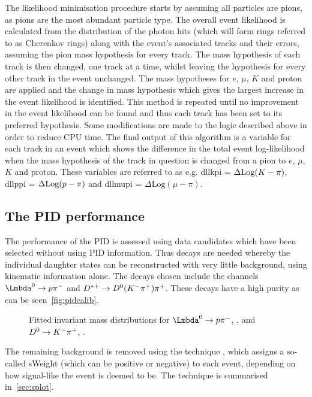 
The likelihood minimisation procedure starts by assuming all particles are pions, as pions are the most abundant particle type. The overall event likelihood is calculated from the distribution of the photon hits (which will form rings referred to as Cherenkov rings) along with the event's associated tracks and their errors, assuming the pion mass hypothesis for every track. The mass hypothesis of each track is then changed, one track at a time, whilst leaving the hypothesis for every other track in the event unchanged. The mass hypotheses for $e$, $\mu$, $K$ and proton are applied and the change in mass hypothesis which gives the largest increase in the event likelihood is identified. This method is repeated until no improvement in the event likelihood can be found and thus each track has been set to its preferred hypothesis. Some modifications are made to the logic described above in order to reduce CPU time. The final output of this algorithm is a variable for each track in an event which shows the difference in the total event log-likelihood when the mass hypothesis of the track in question is changed from a pion to $e$, $\mu$, $K$ and proton. These variables are referred to as e.g. \gls{dllkpi}  = $\Delta \text{Log}({K} - \pi)$, \gls{dllppi} = $\Delta \text{Log}({p} - \pi)$ and \gls{dllmupi} = $\Delta \text{Log}(\mu - \pi)$. %
\subsection{The PID performance}
\label{sec:pidperf}

The performance of the PID is assessed using data candidates which have been selected without using PID information. Thus decays are needed whereby the individual daughter states can be reconstructed with very little background, using kinematic information alone. The decays chosen include the channels $\PLambda^{0}\to\proton\pim$ and $D^{*+} \rightarrow D^{0}({K}^{-}{{\pi}^+}){{\pi}^+}$. These decays have a high purity as can be seen~\autoref{fig:pidcalib}.
\begin{figure}[h!]
  \centering
  \caption{Fitted invariant mass distributions for $\PLambda^{0}\to\proton\pim$, \protect{}, and $D^{0}\rightarrow {\ensuremath{K}}^{-}{{\pi}^+}$, \protect{} \cite{LHCb-DP-2012-003}.}
  \label{fig:pidcalib}
\end{figure}
The remaining background is removed using the \sPlot technique \cite{sPlot}, which assigns a so-called sWeight (which can be positive or negative) to each event, depending on how signal-like the event is deemed to be.  The \sPlot technique is summarised in~\autoref{sec:splot}.

